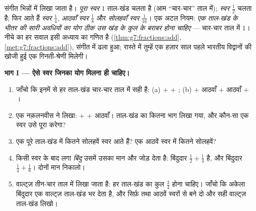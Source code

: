 \begin{problem}
\label{pb:g7:fractions:1}
संगीत भिन्नों में लिखा जाता है। \emph{पूरा स्वर} $1$ ताल-खंड चलता
है (आम ``चार-चार'' ताल में); \emph{ स्वर} $\frac12$ चलता है;
फिर आते हैं \emph{ स्वर} $\frac14$, \emph{आठवाँ स्वर} $\frac18$
और \emph{सोलहवाँ स्वर} $\frac{1}{16}$। एक अटल नियम: \emph{एक
ताल-खंड के भीतर की सारी अवधियों का योग ठीक उस खंड के कुल के बराबर
होना चाहिए} --- चार-चार ताल में $1$। नीचे का हर सवाल इसी अध्याय का
गणित है (\cref{thm:g7:fractions:add}, \cref{met:g7:fractions:add}),
संगीत में ढला हुआ; रास्ते में तुम्हें एक हज़ार साल पहले भारतीय
विद्वानों की खोजी हुई एक गिनती-श्रेणी मिलेगी।

\medskip
\noindent\textbf{भाग I --- ऐसे स्वर जिनका योग मिलना ही चाहिए।}
\begin{enumerate}
  \item जाँचो कि इनमें से हर ताल-खंड चार-चार ताल में सही है:
        (a)  $+$  $+$ ; (b)  $+$ आठवाँ $+$
        आठवाँ $+$ ।
  \item एक नक़लनवीस ने लिखा:  $+$  $+$ आठवाँ। ताल-खंड का
        कितना भाग लिखा गया, और कौन-सा एक स्वर उसे पूरा करेगा?
  \item एक पूरे ताल-खंड में कितने सोलहवें स्वर आते हैं? एक आठवें
        स्वर में कितने सोलहवें?
  \item किसी स्वर के बाद लगा \emph{बिंदु} उसमें उसका  मान और
        जोड़ देता है: बिंदुदार  $\frac12 + \frac14$ है, और
        बिंदुदार  $\frac14 + \frac18$। दोनों मान निकालो।
  \item वाल्ट्ज़ तीन-चार ताल में लिखा जाता है: हर ताल-खंड का कुल
        $\frac34$ होना चाहिए। जाँचो कि अकेला बिंदुदार  एक
        वाल्ट्ज़ ताल-खंड भर देता है, और सिर्फ़  तथा आठवें
        स्वरों से बने दो और सही वाल्ट्ज़ ताल-खंड लिखो।
\end{enumerate}


\end{problem}
